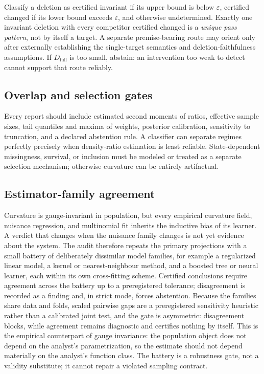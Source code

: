 \documentclass[11pt]{article}
\newcommand{\eps}{\varepsilon}
\begin{document}
Classify a deletion as certified invariant if its upper bound is below \(\eps\), certified changed if its lower bound exceeds \(\eps\), and otherwise undetermined.  Exactly one invariant deletion with every competitor certified changed is a \emph{unique pass pattern}, not by itself a target.  A separate premise-bearing route may orient only after externally establishing the single-target semantics and deletion-faithfulness assumptions.  If \(D_{\mathrm{full}}\) is too small, abstain: an intervention too weak to detect cannot support that route reliably.

\subsection{Overlap and selection gates}

Every report should include estimated second moments of ratios, effective sample sizes, tail quantiles and maxima of weights, posterior calibration, sensitivity to truncation, and a declared abstention rule.  A classifier can separate regimes perfectly precisely when density-ratio estimation is least reliable.  State-dependent missingness, survival, or inclusion must be modeled or treated as a separate selection mechanism; otherwise curvature can be entirely artifactual.

\subsection{Estimator-family agreement}

Curvature is gauge-invariant in population, but every empirical curvature field, nuisance regression, and multinomial fit inherits the inductive bias of its learner.  A verdict that changes when the nuisance family changes is not yet evidence about the system.  The audit therefore repeats the primary projections with a small battery of deliberately dissimilar model families, for example a regularized linear model, a kernel or nearest-neighbour method, and a boosted tree or neural learner, each within its own cross-fitting scheme.  Certified conclusions require agreement across the battery up to a preregistered tolerance; disagreement is recorded as a finding and, in strict mode, forces abstention.  Because the families share data and folds, scaled pairwise gaps are a preregistered sensitivity heuristic rather than a calibrated joint test, and the gate is asymmetric: disagreement blocks, while agreement remains diagnostic and certifies nothing by itself.  This is the empirical counterpart of gauge invariance: the population object does not depend on the analyst's parametrization, so the estimate should not depend materially on the analyst's function class.  The battery is a robustness gate, not a validity substitute; it cannot repair a violated sampling contract.
\end{document}
